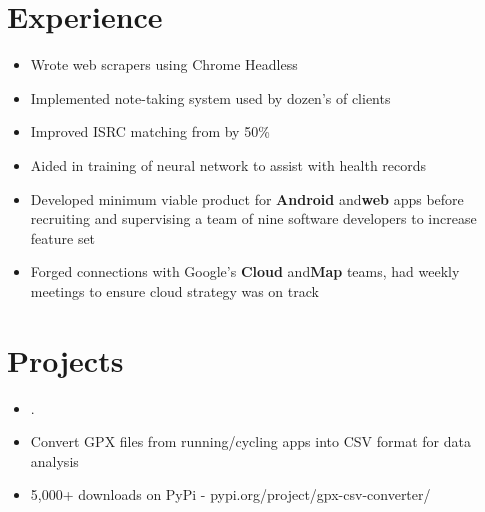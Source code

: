 \documentclass[]{houston-ethan-resume}
\begin{document}
\begin{minipage}[t]{0.66\textwidth}


\section{Experience}
\begin{itemize}[noitemsep,topsep=0pt]
\itemsep0em 
\item Wrote web scrapers using Chrome Headless
\item Implemented note-taking system used by dozen's of clients
\item Improved ISRC matching from by 50\%
\end{itemize}
\sectionsep

\begin{itemize}[noitemsep,topsep=0pt]
\itemsep0em 
\item Aided in training of neural network to assist with health records
\end{itemize}
\sectionsep

\begin{itemize}[noitemsep,topsep=0pt]
\itemsep0em 
\item Developed minimum viable product for ​\textbf{Android}​ and ​​\textbf{web}​ apps before recruiting and supervising a team of nine software developers to increase feature set
\item Forged connections with Google’s ​​\textbf{Cloud}​ and ​​\textbf{Map}​ teams, had weekly meetings to ensure cloud strategy was on track
\end{itemize}
\sectionsep

\section{Projects}
\begin{itemize}[noitemsep,topsep=0pt]
\itemsep-0.2em 
\item .
\end{itemize}
\sectionsep
{}
\begin{itemize}[noitemsep,topsep=0pt]
\itemsep-0.2em 
\item Convert GPX files from running/cycling apps into CSV format for data analysis
\item 5,000+ downloads on PyPi - pypi.org/project/gpx-csv-converter/
\end{itemize}
\sectionsep


\end{minipage}
\end{document}
